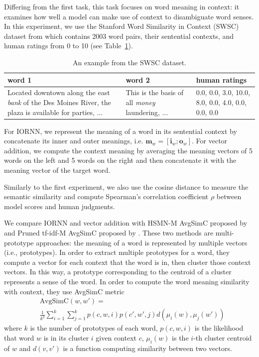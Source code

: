 \documentclass[11pt]{article}
\begin{document}
Differing from the first task, this task focuses on word meaning in context: 
it examines how well a model can make use of context to disambiguate word senses. 
In this experiment, we use the Stanford Word Similarity in Context (SWSC) dataset
from  which contains 2003 word pairs, their sentential 
contexts, and human ratings from 0 to 10 (see Table~\ref{table swsc}).

\begin{table}[!ht]
	\center
	\begin{tabular}{|p{6cm}|p{6cm}|p{3cm}|}
		\hline
		word 1 & word 2 & human ratings \\ \hline \hline
		
		 Located downtown along the east \textit{bank} of the Des Moines River, the plaza is available for parties, ... & This is the basis of all \textit{ money} laundering, ... &  0.0, 0.0, 3.0, 10.0, 8.0, 0.0, 4.0, 0.0, 0.0, 0.0 \\ \hline
	\end{tabular}
	\caption{An example from the SWSC dataset.}
	\label{table swsc}
\end{table}

For IORNN, we represent the meaning of a word in its sentential context by concatenate its inner 
and outer meanings, i.e. $\mathbf{m}_w = [\mathbf{i}_w;\mathbf{o}_w]$. 
For vector addition, we compute the context meaning by averaging the meaning vectors of 5 words
on the left and 5 words on the right and then concatenate it with the meaning vector of the target 
word.

Similarly to the first experiment, we also use the cosine distance to measure the semantic similarity
and compute Spearman's correlation coefficient $\rho$ between model scores and human judgments.

We compare IORNN and vector addition with HSMN-M AvgSimC proposed by 
and Pruned tf-idf-M AvgSimC proposed by .
These two methods are multi-prototype approaches: the meaning of a word is represented 
by multiple vectors (i.e., prototypes). In order to extract multiple prototypes for a word, they compute 
a vector for each context that the word is in, then cluster those context vectors. In this way, a prototype
corresponding to the centroid of a cluster represents a sense of the word. 
In order to compute the word meaning similarity with context, they use AvgSimC metric 
\begin{align*}
	&\text{AvgSimC}(w,w') = \\
	&\frac{1}{k^2} \sum_{i=1}^k \sum_{j=1}^k p(c,w,i)p(c',w',j)d(\mu_i(w),\mu_j(w'))
\end{align*}
where $k$ is the number of prototypes of each word, $p(c,w,i)$ is the likelihood that word $w$ is in 
its cluster $i$ given context $c$, $\mu_i(w)$ is the $i$-th cluster centroid of $w$ and $d(v,v')$ is a function 
computing similarity between two vectors.
\end{document}
